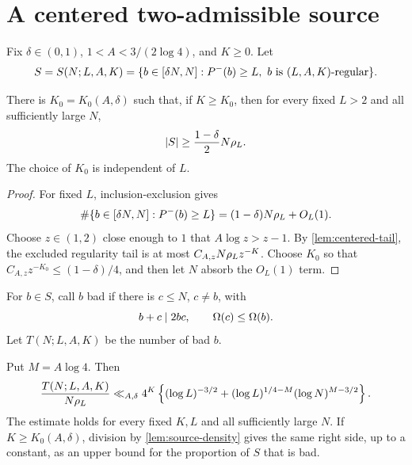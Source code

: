 \documentclass[11pt]{article}
\begin{document}
\section{A centered two-admissible source}\label{sec:source}

Fix \(\delta\in(0,1)\), \(1<A<3/(2\log4)\), and \(K\geq0\). Let
\[
 S=S(N;L,A,K)
 =
 \{b\in[\delta N,N]:P^-(b)\geq L,\
 b\text{ is \((L,A,K)\)-regular}\}.
\]

\begin{lemma}\label{lem:source-density}
There is \(K_0=K_0(A,\delta)\) such that, if \(K\geq K_0\), then for every
fixed \(L>2\) and all sufficiently large \(N\),
\[
 \left|S\right|\geq\frac{1-\delta}{2}N\rho_L.
\]
The choice of \(K_0\) is independent of \(L\).
\end{lemma}

\begin{proof}
For fixed \(L\), inclusion-exclusion gives
\[
 \#\{b\in[\delta N,N]:P^-(b)\geq L\}
 =(1-\delta)N\rho_L+O_L(1).
\]
Choose \(z\in(1,2)\) close enough to \(1\) that
\(A\log z>z-1\). By \cref{lem:centered-tail}, the excluded regularity tail
is at most \(C_{A,z}N\rho_L z^{-K}\). Choose \(K_0\) so that
\(C_{A,z}z^{-K_0}\leq(1-\delta)/4\), and then let \(N\) absorb the
\(O_L(1)\) term.
\end{proof}

For \(b\in S\), call \(b\) bad if there is \(c\leq N\), \(c\ne b\), with
\begin{equation}\label{eq:source-conflict}
 b+c\mid2bc,\qquad \Omega(c)\leq\Omega(b).
\end{equation}
Let \(T(N;L,A,K)\) be the number of bad \(b\).

\begin{proposition}\label{prop:source-estimate}
Put \(M=A\log4\). Then
\begin{equation}\label{eq:source-raw}
 \frac{T(N;L,A,K)}{N\rho_L}
 \ll_{A,\delta}
 4^K\left\{
  (\log L)^{-3/2}
  +(\log L)^{1/4-M}(\log N)^{M-3/2}
 \right\}.
\end{equation}
The estimate holds for every fixed \(K,L\) and all sufficiently large
\(N\). If \(K\geq K_0(A,\delta)\), division by
\cref{lem:source-density} gives the same right side, up to a constant, as
an upper bound for the proportion of \(S\) that is bad.
\end{proposition}
\end{document}
